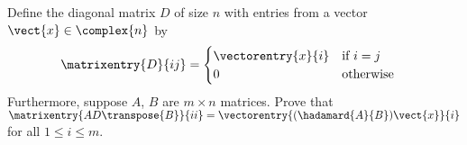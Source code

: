 Define the diagonal matrix $D$ of size $n$ with entries from a vector $\vect{x}\in\complex{n}$ by
\begin{align*}
\matrixentry{D}{ij}
&=
\begin{cases}
\vectorentry{x}{i}&\text{if $i=j$}\\
0&\text{otherwise}
\end{cases}
\end{align*}
%
Furthermore, suppose $A$, $B$ are $m\times n$ matrices. Prove that 
$\matrixentry{AD\transpose{B}}{ii}=\vectorentry{(\hadamard{A}{B})\vect{x}}{i}$ for all $1 \leq i \leq m$.
